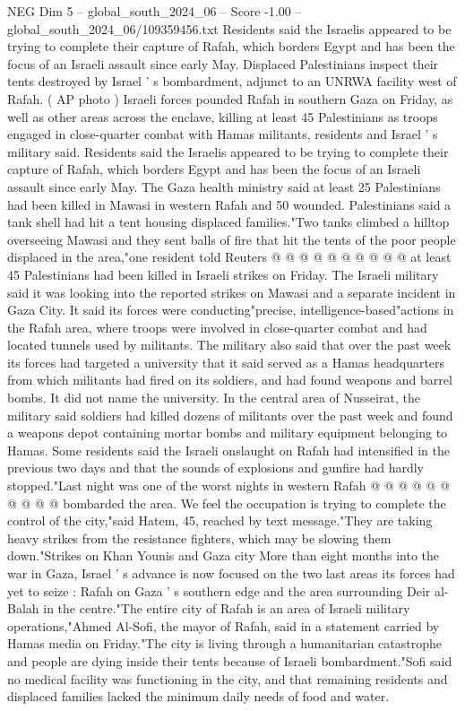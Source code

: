 \begin{textsample}{NEG Dim 5 – global\_south\_2024\_06 – Score -1.00 – global\_south\_2024\_06/109359456.txt}  \label{ex:f5_neg_236}
Residents said the Israelis appeared to be trying to complete their capture of Rafah, which borders Egypt and has been the focus of an Israeli assault since early May.
Displaced Palestinians inspect their tents destroyed by Israel ' s bombardment, adjunct to an UNRWA facility west of Rafah. ( AP photo ) Israeli forces pounded Rafah in southern Gaza on Friday, as well as other areas across the enclave, killing at least 45 Palestinians as troops engaged in close-quarter combat with Hamas militants, residents and Israel ' s military said.
Residents said the Israelis appeared to be trying to complete their capture of Rafah, which borders Egypt and has been the focus of an Israeli assault since early May.
The Gaza health ministry said at least 25 Palestinians had been killed in Mawasi in western Rafah and 50 wounded.
Palestinians said a tank shell had hit a tent housing displaced families."Two tanks climbed a hilltop overseeing Mawasi and they sent balls of fire that hit the tents of the poor people displaced in the area,"one resident told Reuters @ @ @ @ @ @ @ @ @ @ at least 45 Palestinians had been killed in Israeli strikes on Friday.
The Israeli military said it was looking into the reported strikes on Mawasi and a separate incident in Gaza City.
It said its forces were conducting"precise, intelligence-based"actions in the Rafah area, where troops were involved in close-quarter combat and had located tunnels used by militants.
The military also said that over the past week its forces had targeted a university that it said served as a Hamas headquarters from which militants had fired on its soldiers, and had found weapons and barrel bombs.
It did not name the university.
In the central area of Nusseirat, the military said soldiers had killed dozens of militants over the past week and found a weapons depot containing mortar bombs and military equipment belonging to Hamas.
Some residents said the Israeli onslaught on Rafah had intensified in the previous two days and that the sounds of explosions and gunfire had hardly stopped."Last night was one of the worst nights in western Rafah @ @ @ @ @ @ @ @ @ @ bombarded the area.
We feel the occupation is trying to complete the control of the city,"said Hatem, 45, reached by text message."They are taking heavy strikes from the resistance fighters, which may be slowing them down."Strikes on Khan Younis and Gaza city More than eight months into the war in Gaza, Israel ' s advance is now focused on the two last areas its forces had yet to seize : Rafah on Gaza ' s southern edge and the area surrounding Deir al-Balah in the centre."The entire city of Rafah is an area of Israeli military operations,"Ahmed Al-Sofi, the mayor of Rafah, said in a statement carried by Hamas media on Friday."The city is living through a humanitarian catastrophe and people are dying inside their tents because of Israeli bombardment."Sofi said no medical facility was functioning in the city, and that remaining residents and displaced families lacked the minimum daily needs of food and water.

\end{textsample}
